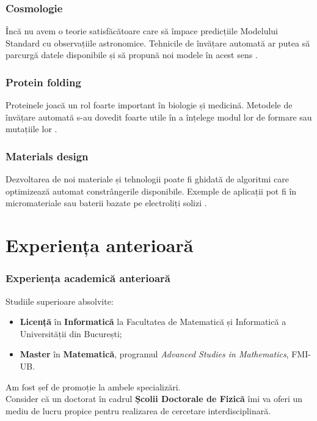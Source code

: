\begin{frame}
\frametitle{Cosmologie}

Încă nu avem o teorie satisfăcătoare care să împace predicțiile Modelului Standard cu observațiile astronomice. Tehnicile de învățare automată ar putea să parcurgă datele disponibile și să propună noi modele în acest sens \autocite{Fernndez2023}.
\end{frame}

\begin{frame}
\frametitle{Protein folding}

Proteinele joacă un rol foarte important în biologie și medicină. Metodele de învățare automată s-au dovedit foarte utile în a înțelege modul lor de formare \autocite{Jumper2021} sau mutațiile lor \autocite{Cheng2023}.
\end{frame}

\begin{frame}
\frametitle{Materials design}

Dezvoltarea de noi materiale și tehnologii poate fi ghidată de algoritmi care optimizează automat constrângerile disponibile. Exemple de aplicații pot fi în micromateriale \autocite{NguyenThanh2021} sau baterii bazate pe electroliți solizi \autocite{Xiao2019}.
\end{frame}

\section{Experiența anterioară}

\begin{frame}
\frametitle{Experiența academică anterioară}

Studiile superioare absolvite:
\begin{itemize}
    \item \textbf{Licență} în \textbf{Informatică} la Facultatea de Matematică și Informatică a Universității din București;
    \item \textbf{Master} în \textbf{Matematică}, programul \emph{Advanced Studies in Mathematics}, FMI-UB.
\end{itemize}
Am fost șef de promoție la ambele specializări. \\[1em]

Consider că un doctorat în cadrul \textbf{Școlii Doctorale de Fizică} îmi va oferi un mediu de lucru propice pentru realizarea de cercetare interdisciplinară. 
\end{frame}

